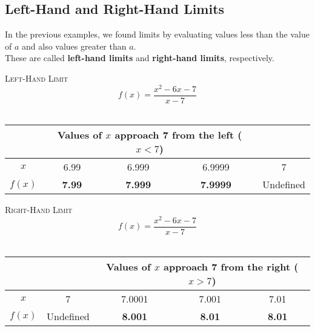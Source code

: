 \documentclass{article}
\newcounter{example}[section]
\newenvironment{example}[1][]{\refstepcounter{example}\par\medskip
   {\color{red}\textbf{Example~\theexample. #1}}}{\medskip}
\begin{document}


\subsection*{Left-Hand and Right-Hand Limits}

In the previous examples, we found limits by evaluating values less than the value of $a$ and also values greater than $a$. \newline\\
    
These are called {\color{blue}\textbf{left-hand limits}} and {\color{blue}\textbf{right-hand limits}}, respectively.
\vspace{1in}

\newpage 

\textsc{Left-Hand Limit}
    \[
    f(x) = \frac{x^2-6x-7}{x-7}
    \]
    \newline\\
    \begin{center}
    \begin{tabular}{c|c|c|c|c|}
        {} & \multicolumn{3}{|c|}{Values of $x$ approach 7 from the left ($x < 7$)} & \\ \hline
        $x$ & 6.99 & 6.999 & 6.9999 & 7 \\[6pt]
        $f(x)$ & \textbf{7.99} & \textbf{7.999} & \textbf{7.9999} & Undefined \\[8pt]
    \end{tabular}
    \end{center}
\vfill 

\textsc{Right-Hand Limit}
    \[
    f(x) = \frac{x^2-6x-7}{x-7}
    \]
    \newline\\
    \begin{center}
    \begin{tabular}{c|c|c|c|c|}
        {} & & \multicolumn{3}{|c|}{Values of $x$ approach 7 from the right ($x > 7$)} \\ \hline
        $x$ & 7 & 7.0001 & 7.001 & 7.01 \\[6pt]
        $f(x)$ & Undefined & \textbf{8.001} & \textbf{8.01} & \textbf{8.01} \\[8pt]
    \end{tabular}
    \end{center}
\vfill 
\end{document}
